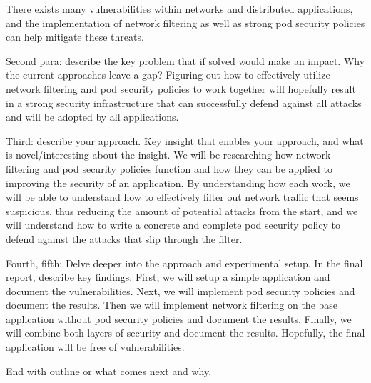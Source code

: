 There exists many vulnerabilities within networks and distributed 
applications, and the implementation of network filtering
as well as strong pod security policies can help mitigate
these threats.

Second para: describe the key problem that if solved would make
an impact. Why the current approaches leave a gap?
Figuring out how to effectively utilize network filtering and
pod security policies to work together will hopefully result
in a strong security infrastructure that can successfully
defend against all attacks and will be adopted by all applications.

Third: describe your approach. Key insight that enables your approach,
and what is novel/interesting about the insight.
We will be researching how network filtering and pod security policies
function and how they can be applied to improving the security of
an application. By understanding how each work, we will be able to
understand how to effectively filter out network traffic that seems
suspicious, thus reducing the amount of potential attacks from the
start, and we will understand how to write a concrete and complete
pod security policy to defend against the attacks that slip through
the filter.

Fourth, fifth: Delve deeper into the approach and experimental setup.
In the final report, describe key findings.
First, we will setup a simple application and document the vulnerabilities.
Next, we will implement pod security policies and document the results.
Then we will implement network filtering on the base application without pod security policies
and document the results. Finally, we will combine both layers of security and document the results.
Hopefully, the final application will be free of vulnerabilities.

End with outline or what comes next and why.

